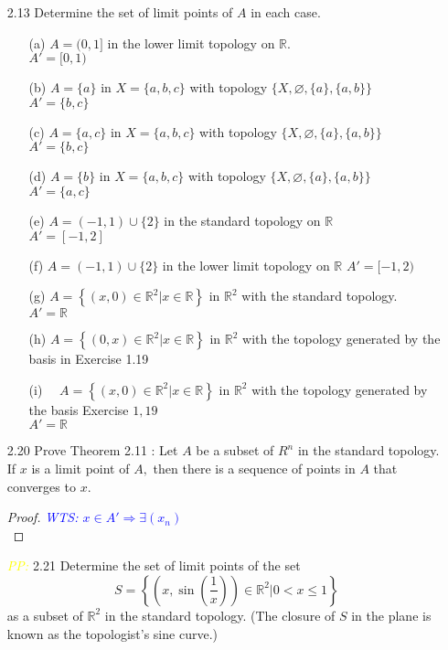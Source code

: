\documentclass[12pt]{article}
\newcommand{\R}{\mathbb{R}}
\newcommand{\wts}[1]{\textit{\textcolor{blue}{WTS: #1}}\\}
\newcommand{\pp}{\textit{\textcolor{yellow}{PP: }}}%
\begin{document}
\begin{enumerate}
	
	
	\item[2.13] Determine the set of limit points of $ A $ in each case.
		\begin{enumerate}
			\item[(a)] $A=(0,1]$ in the lower limit topology on $\mathbb{R}$.\\
			$ A'=[0,1) $
			\item[(b)] $A=\{a\}$ in $X=\{a, b, c\}$ with topology $\{X, \varnothing,\{a\},\{a, b\}\}$\\
			$ A' = \{b,c\} $
			\item[(c)] $A=\{a, c\}$ in $X=\{a, b, c\}$ with topology $\{X, \varnothing,\{a\},\{a, b\}\}$\\
				$ A' = \{b,c\} $
			\item[(d)] $A=\{b\}$ in $X=\{a, b, c\}$ with topology $\{X, \varnothing,\{a\},\{a, b\}\}$\\
				$ A' = \{a,c\} $
			\item[(e)] $ A=(-1,1) \cup\{2\}$ in the standard topology on $\mathbb{R}$\\
			$ A'=[-1,2] $
			\item[(f)] $A=(-1,1) \cup\{2\}$ in the lower limit topology on $\mathbb{R}$
				$ A'=[-1,2) $
			\item[(g)] $A=\left\{(x, 0) \in \mathbb{R}^{2} | x \in \mathbb{R}\right\}$ in $\mathbb{R}^{2}$ with the standard topology.\\
			$ A' = \R $
			\item[(h)] $A=\left\{(0, x) \in \mathbb{R}^{2} | x \in \mathbb{R}\right\}$ in $\mathbb{R}^{2}$ with the topology generated by the basis in Exercise 1.19\\
			
			\item[(i)] $\quad A=\left\{(x, 0) \in \mathbb{R}^{2} | x \in \mathbb{R}\right\}$ in $\mathbb{R}^{2}$ with the topology generated by the basis Exercise $1,19$\\
			$ A' = \R $
		\end{enumerate}
	\item[2.20] Prove Theorem 2.11 : Let $A$ be a subset of $R^{n}$ in the standard topology. If $x$ is a limit point of $A,$ then there is a sequence of points in $A$ that converges to $x$.
	\begin{proof}
		\wts{$ x \in A' \Rightarrow \exists (x_n)$}
	\end{proof}
	\item[\pp2.21] Determine the set of limit points of the set
	$$
	S=\left\{\left(x, \sin \left(\frac{1}{x}\right)\right) \in \mathbb{R}^{2} | 0<x \leq 1\right\}
	$$
	as a subset of $\mathbb{R}^{2}$ in the standard topology. (The closure of $S$ in the plane is known as the topologist's sine curve.)
	
\end{enumerate}
\end{document}
